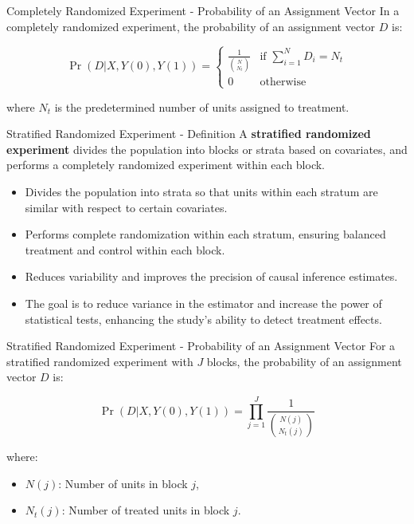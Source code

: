 \documentclass[xcolor=svgnames,t]{beamer}
\begin{document}
\begin{frame}{Completely Randomized Experiment - Probability of an Assignment Vector}
    In a completely randomized experiment, the probability of an assignment vector \( D \) is:
    
    \[
    \Pr(D | X, Y(0), Y(1)) = \begin{cases}
        \frac{1}{\binom{N}{N_t}} & \text{if } \sum_{i=1}^N D_i = N_t \\
        0 & \text{otherwise}
    \end{cases}
    \]
    
    where \( N_t \) is the predetermined number of units assigned to treatment.
\end{frame}

\begin{frame}{Stratified Randomized Experiment - Definition}
    A \textbf{stratified randomized experiment} divides the population into blocks or strata based on covariates, and performs a completely randomized experiment within each block.
    
    \begin{itemize}
        \item Divides the population into strata so that units within each stratum are similar with respect to certain covariates.
        \pause
        \item Performs complete randomization within each stratum, ensuring balanced treatment and control within each block.
        \pause
        \item Reduces variability and improves the precision of causal inference estimates.
        \pause
        \item The goal is to reduce variance in the estimator and increase the power of statistical tests, enhancing the study's ability to detect treatment effects.
    \end{itemize}
\end{frame}

\begin{frame}{Stratified Randomized Experiment - Probability of an Assignment Vector}
    For a stratified randomized experiment with \( J \) blocks, the probability of an assignment vector \( D \) is:

    \[
    \Pr(D | X, Y(0), Y(1)) = \prod_{j=1}^J \frac{1}{\binom{N(j)}{N_t(j)}}
    \]

    where:
    \begin{itemize}
        \item \( N(j) \): Number of units in block \( j \),
        \item \( N_t(j) \): Number of treated units in block \( j \).
    \end{itemize}
\end{frame}
\end{document}
